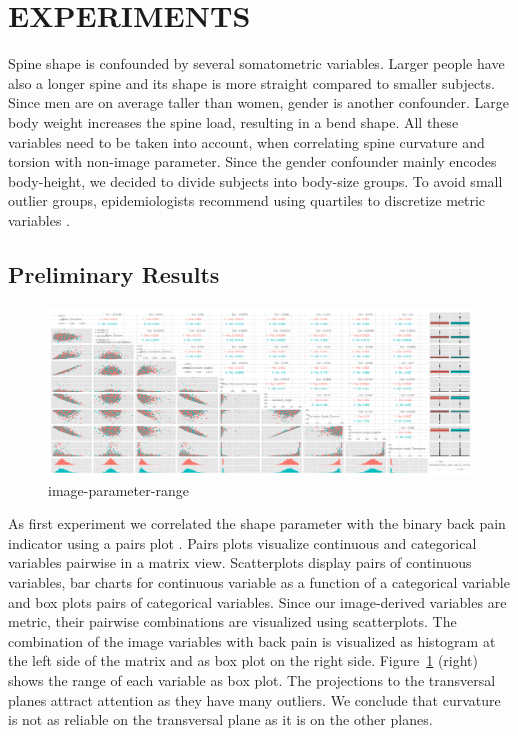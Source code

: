\documentclass[a4paper,twoside]{style/article}
\begin{document}
\section{\uppercase{Experiments}}
\label{sec:Experiments}
\noindent Spine shape is confounded by several somatometric variables.
Larger people have also a longer spine and its shape is more straight compared to smaller subjects.
Since men are on average taller than women, gender is another confounder.
Large body weight increases the spine load, resulting in a bend shape.
All these variables need to be taken into account, when correlating spine curvature and torsion with non-image parameter.
Since the gender confounder mainly encodes body-height, we decided to divide subjects into body-size groups.
To avoid small outlier groups, epidemiologists recommend using quartiles to discretize metric variables \cite{KlemmVIS14}.
\subsection{Preliminary Results}
\begin{figure}[htb]
  \centering
  \includegraphics[width=1.0\textwidth]{figures/image-parameter-range}
  \caption{image-parameter-range}
  \label{fig:image-parameter-range}
\end{figure}
\noindent As first experiment we correlated the shape parameter with the binary back pain indicator using a pairs plot \cite{ggally}.
Pairs plots visualize continuous and categorical variables pairwise in a matrix view.
Scatterplots display pairs of continuous variables, bar charts for continuous variable as a function of a categorical variable and box plots pairs of categorical variables.
Since our image-derived variables are metric, their pairwise combinations are visualized using scatterplots.
The combination of the image variables with back pain is visualized as histogram at the left side of the matrix and as box plot on the right side.
Figure~\ref{fig:image-parameter-range} (right) shows the range of each variable as box plot.
The projections to the transversal planes attract attention as they have many outliers.
We conclude that curvature is not as reliable on the transversal plane as it is on the other planes.
\end{document}
